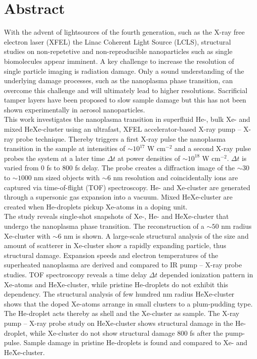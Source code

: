 \section*{Abstract}\label{ch:abstract}
With the advent of lightsources of the fourth generation, such as the X-ray free electron laser (XFEL) the Linac Coherent Light Source (LCLS), structural studies on non-repetetive and non-reproducible nanoparticles such as single biomolecules appear imminent. A key challenge to increase the resolution of single particle imaging is radiation damage. Only a sound understanding of the underlying damage processes, such as the nanoplasma phase transition, can overcome this challenge and will ultimately lead to higher resolutions. Sacrificial tamper layers have been proposed to slow sample damage but this has not been shown experimentally in aerosol nanoparticles.\\[1\baselineskip]
This work investigates the nanoplasma transition in superfluid He-, bulk Xe- and mixed HeXe-cluster using an ultrafast, XFEL accelerator-based X-ray pump -- X-ray probe technique. Thereby triggers a first X-ray pulse the nanoplasma transition in the sample at intensities of $\sim 10^{17}$ W cm$^{-2}$ and a second X-ray pulse probes the system at a later time $\Delta t$ at power densities of $\sim 10^{18}$ W cm$^{-2}$. $\Delta t$ is varied from 0 fs to 800 fs delay. The probe creates a diffraction image of the $\sim 30$ to $\sim 1000$ nm sized objects with $\sim 6$ nm resolution and coincidentally ions are captured via time-of-flight (TOF) spectroscopy. He- and Xe-cluster are generated through a supersonic gas expansion into a vacuum. Mixed HeXe-cluster are created when He-droplets pickup Xe-atoms in a doping unit.\\[1\baselineskip]
The study reveals single-shot snapshots of Xe-, He- and HeXe-cluster that undergo the nanoplasma phase transition. The reconstruction of a $\sim 50$ nm radius Xe-cluster with $\sim 6$ nm is shown. A large-scale structural analysis of the size and amount of scatterer in Xe-cluster show a rapidly expanding particle, thus structural damage. Expansion speeds and electron temperatures of the superheated nanoplasma are derived and compared to IR pump -- X-ray probe studies. TOF spectroscopy reveals a time delay $\Delta t$ depended ionization pattern in Xe-atoms and HeXe-cluster, while pristine He-droplets do not exhibit this dependency. The structural analysis of few hundred nm radius HeXe-cluster shows that the doped Xe-atoms arrange in small clusters to a plum-pudding type. The He-droplet acts thereby as shell and the Xe-cluster as sample. The X-ray pump -- X-ray probe study on HeXe-cluster shows structural damage in the He-droplet, while Xe-cluster do not show structural damage 800 fs after the pump-pulse. Sample damage in pristine He-droplets is found and compared to Xe- and HeXe-cluster.
%
%
%
%